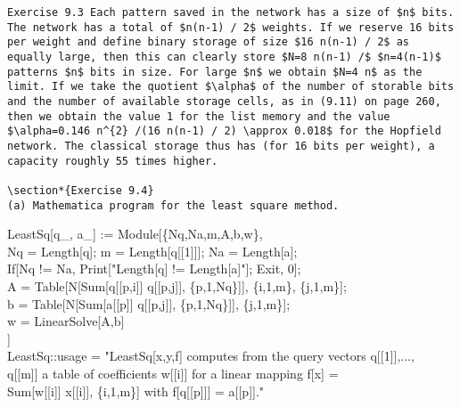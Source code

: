 \documentclass[10pt]{article}
\begin{document}
\begin{verbatim}
Exercise 9.3 Each pattern saved in the network has a size of $n$ bits. The network has a total of $n(n-1) / 2$ weights. If we reserve 16 bits per weight and define binary storage of size $16 n(n-1) / 2$ as equally large, then this can clearly store $N=8 n(n-1) /$ $n=4(n-1)$ patterns $n$ bits in size. For large $n$ we obtain $N=4 n$ as the limit. If we take the quotient $\alpha$ of the number of storable bits and the number of available storage cells, as in (9.11) on page 260, then we obtain the value 1 for the list memory and the value $\alpha=0.146 n^{2} /(16 n(n-1) / 2) \approx 0.018$ for the Hopfield network. The classical storage thus has (for 16 bits per weight), a capacity roughly 55 times higher.

\section*{Exercise 9.4}
(a) Mathematica program for the least square method.
\end{verbatim}

LeastSq[q\_, a\_] := Module[\{Nq,Na,m,A,b,w\},\\[0pt]
Nq = Length[q]; m = Length[q[[1]]]; Na = Length[a];\\[0pt]
If[Nq != Na, Print["Length[q] != Length[a]"]; Exit, 0];\\[0pt]
A = Table[N[Sum[q[[p,i]] q[[p,j]], \{p,1,Nq\}]], \{i,1,m\}, \{j,1,m\}];\\[0pt]
b = Table[N[Sum[a[[p]] q[[p,j]], \{p,1,Nq\}]], \{j,1,m\}];\\[0pt]
w = LinearSolve[A,b]\\[0pt]
]\\[0pt]
LeastSq::usage = "LeastSq[x,y,f] computes from the query vectors q[[1]],...,\\[0pt]
q[[m]] a table of coefficients w[[i]] for a linear mapping f[x] =\\[0pt]
Sum[w[[i]] x[[i]], \{i,1,m\}] with f[q[[p]]] = a[[p]]."
\end{document}
